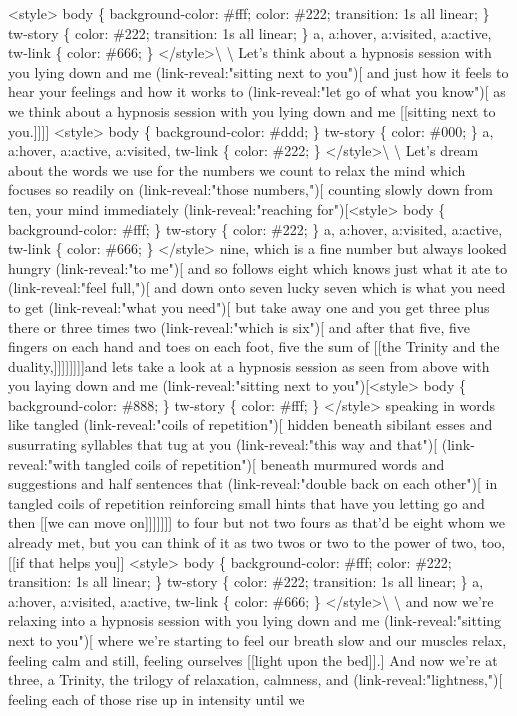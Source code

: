\textless{}style\textgreater{} body \{ background-color: \#fff; color: \#222; transition: 1s all linear; \} tw-story \{ color: \#222; transition: 1s all linear; \} a, a:hover, a:visited, a:active, tw-link \{ color: \#666; \} \textless{}/style\textgreater{}\textbackslash{} \textbackslash{} Let's think about a hypnosis session with you lying down and me (link-reveal:"sitting next to you"){[} and just how it feels to hear your feelings and how it works to (link-reveal:"let go of what you know"){[} as we think about a hypnosis session with you lying down and me {[}{[}sitting next to you.{]}{]}{]}{]} \textless{}style\textgreater{} body \{ background-color: \#ddd; \} tw-story \{ color: \#000; \} a, a:hover, a:active, a:visited, tw-link \{ color: \#222; \} \textless{}/style\textgreater{}\textbackslash{} \textbackslash{} Let's dream about the words we use for the numbers we count to relax the mind which focuses so readily on (link-reveal:"those numbers,"){[} counting slowly down from ten, your mind immediately (link-reveal:"reaching for"){[}\textless{}style\textgreater{} body \{ background-color: \#fff; \} tw-story \{ color: \#222; \} a, a:hover, a:visited, a:active, tw-link \{ color: \#666; \} \textless{}/style\textgreater{} nine, which is a fine number but always looked hungry (link-reveal:"to me"){[} and so follows eight which knows just what it ate to (link-reveal:"feel full,"){[} and down onto seven lucky seven which is what you need to get (link-reveal:"what you need"){[} but take away one and you get three plus there or three times two (link-reveal:"which is six"){[} and after that five, five fingers on each hand and toes on each foot, five the sum of {[}{[}the Trinity and the duality,{]}{]}{]}{]}{]}{]}{]}{]}and lets take a look at a hypnosis session as seen from above with you laying down and me (link-reveal:"sitting next to you"){[}\textless{}style\textgreater{} body \{ background-color: \#888; \} tw-story \{ color: \#fff; \} \textless{}/style\textgreater{} speaking in words like tangled (link-reveal:"coils of repetition"){[} hidden beneath sibilant esses and susurrating syllables that tug at you (link-reveal:"this way and that"){[} (link-reveal:"with tangled coils of repetition"){[} beneath murmured words and suggestions and half sentences that (link-reveal:"double back on each other"){[} in tangled coils of repetition reinforcing small hints that have you letting go and then {[}{[}we can move on{]}{]}{]}{]}{]}{]}{]} to four but not two fours as that'd be eight whom we already met, but you can think of it as two twos or two to the power of two, too, {[}{[}if that helps you{]}{]} \textless{}style\textgreater{} body \{ background-color: \#fff; color: \#222; transition: 1s all linear; \} tw-story \{ color: \#222; transition: 1s all linear; \} a, a:hover, a:visited, a:active, tw-link \{ color: \#666; \} \textless{}/style\textgreater{}\textbackslash{} \textbackslash{} and now we're relaxing into a hypnosis session with you lying down and me (link-reveal:"sitting next to you"){[} where we're starting to feel our breath slow and our muscles relax, feeling calm and still, feeling ourselves {[}{[}light upon the bed{]}{]}.{]} And now we're at three, a Trinity, the trilogy of relaxation, calmness, and (link-reveal:"lightness,"){[} feeling each of those rise up in intensity until we 